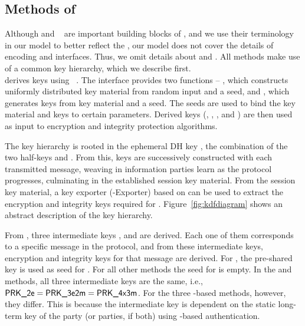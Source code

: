 \subsection{Methods of \mEdhoc{}}
\label{sec:methods}
Although \mCbor{} and \mCose{}~\cite{rfc8152} are important building blocks of
\mEdhoc{}, and we use their terminology in our \mTamarin{} model to better
reflect the \mSpec{}, our model does not cover the details of encoding and
\mCose{} interfaces.
%
Thus, we omit details about \mCbor{} and \mCose{}.
%
All methods make use of a common key hierarchy, which we describe first.
%
\\

\label{sec:keyHierarchy}
\mEdhoc{} derives keys using \mHkdf{}~\cite{rfc5869}.
%
The \mHkdf{} interface provides two functions -- \mHkdfExtract{}, which
constructs uniformly distributed key material from random input and a seed,
and \mHkdfExpand{}, which generates keys from key material and a seed.
%
The seeds are used to bind the key material and keys to certain parameters.
%
Derived keys (\mKtwoe, \mKtwom{}, \mKthreeae, and \mKthreem) are then used as
input to encryption and integrity protection algorithms.
%

The key hierarchy is rooted in the ephemeral DH key \mGxy{}, the combination
of the two half-keys \mGx{} and \mGy{}.
%
From this, keys are successively constructed with each transmitted message,
weaving in information parties learn as the protocol progresses, culminating
in the established session key material.
%
From the session key material, a key exporter (\mEdhoc-Exporter) based on
\mHkdf{} can be used to extract the encryption and integrity keys required
for \mOscore{}.
%
Figure~\ref{fig:kdfdiagram} shows an abstract description of the key hierarchy.
%

From \mGxy{}, three intermediate keys \mPRKtwo, \mPRKthree{} and
\mPRKthree{} are derived.
%
Each one of them corresponds to a specific message in the protocol, and from
these intermediate keys, encryption and integrity keys for that message are
derived.
%
For \mPskPsk{}, the pre-shared key is used as seed for \mPRKtwo.
%
For all other methods the seed for \mPRKtwo{} is empty.
%
In the \mPskPsk{} and \mSigSig{} methods, all three intermediate keys
are the same, i.e., $\textsf{PRK\_2e}{} = \textsf{PRK\_3e2m}{} = \textsf{PRK\_4x3m}$.
%
For the three \mStat-based methods, however, they differ.
%
This is because the intermediate key \mPRKthree{} is dependent on the static
long-term key of the party (or parties, if both) using \mStat{}-based
authentication.
%

